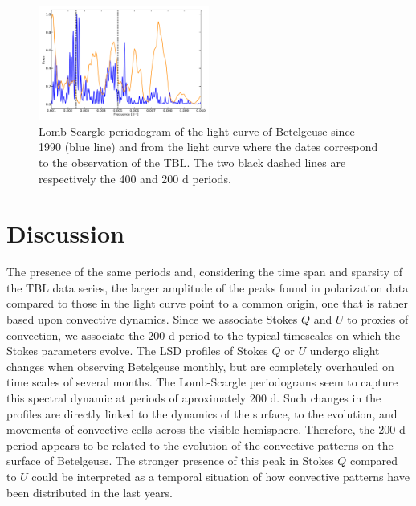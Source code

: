 \documentclass{aa}
\begin{document}
\begin{figure}[!h]
    \centering
    \includegraphics[width=0.5\textwidth]{Lomb-Scargle AAVSO.pdf}
    \caption{Lomb-Scargle periodogram of the light curve of Betelgeuse since 1990 (blue line) and from the light curve where the dates correspond to the observation of the TBL. The two black dashed lines are respectively the 400 and 200 d periods.}
    \label{Lomb Scargle AAVSO}
\end{figure}

\section{Discussion}
\label{section 4}
The presence of the same 
periods and, considering the time span and sparsity of the TBL data series, the larger amplitude of the peaks found in
polarization data compared to those in the light curve point to a common origin, one that is rather based upon convective dynamics. Since we associate Stokes $Q$ and $U$ to proxies of convection, we associate the 200 d period to the typical timescales on which the Stokes parameters evolve. 
The LSD profiles of Stokes $Q$ or $U$ undergo slight changes when observing Betelgeuse monthly, but are completely overhauled 
on time scales of several months. The Lomb-Scargle periodograms seem to capture this spectral dynamic at periods of aproximately 200 d. Such changes in the profiles are directly linked to the dynamics of the surface,  to  the evolution, and movements 
of convective cells across the visible hemisphere. Therefore, the 200 d period appears to be related to the evolution of the convective patterns 
on the surface of Betelgeuse.  The stronger presence of this peak in Stokes $Q$ compared to $U$ could be interpreted as a temporal situation of how convective patterns have been distributed in the
last years.\
\end{document}
